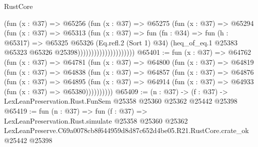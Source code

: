 \begin{lexlean}{RustCore}
\begin{coremodule}
                                  (fun (x : @37) =>
                                  @65256
                                    (fun (x : @37) =>
                                    @65275
                                      (fun (x : @37) =>
                                      @65294
                                        (fun (x : @37) =>
                                        @65313
                                          (fun (x : @37) =>
                                          fun (fn : @34) =>
                                          fun (h : @65317) =>
                                          @65325
                                            @65326
                                            (Eq.refl.{2} (Sort 1) @34)
                                            (heq_of_eq.{1}
                                              @25383
                                              @65323
                                              @65326
                                              @25398)))))))))))))))))))))
@65401 := fun (x : @37) =>
  @64762
    (fun (x : @37) =>
    @64781
      (fun (x : @37) =>
      @64800
        (fun (x : @37) =>
        @64819
          (fun (x : @37) =>
          @64838
            (fun (x : @37) =>
            @64857
              (fun (x : @37) =>
              @64876
                (fun (x : @37) =>
                @64895
                  (fun (x : @37) =>
                  @64914 (fun (x : @37) => @64933 (fun (x : @37) => @65380))))))))))
@65409 := (n : @37) ->
  (f : @37) -> LexLeanPreservation.Rust.FunSem @25358 @25360 @25362 @25442 @25398
@65419 := fun (n : @37) =>
  fun (f : @37) =>
  LexLeanPreservation.Rust.simulate
    @25358
    @25360
    @25362
    LexLeanPreserve.C69a0078cb8f644959d8d87c652d4be05.R21.RustCore.crate_ok
    @25442
    @25398
\end{coremodule}
\end{lexlean}
